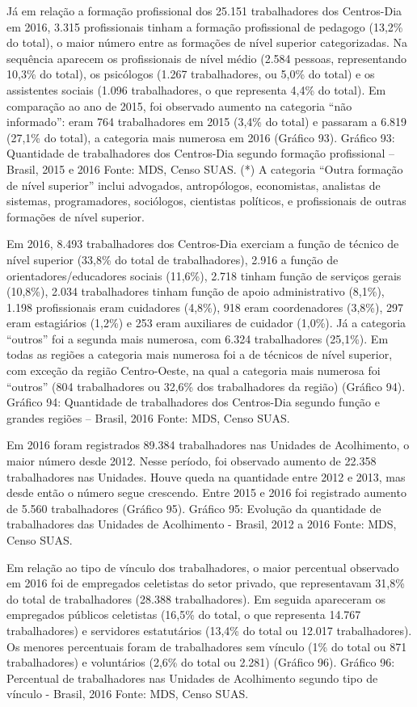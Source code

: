 \documentclass[
  brazilian]{report}
\begin{document}
Já em relação a formação profissional dos 25.151 trabalhadores dos
Centros-Dia em 2016, 3.315 profissionais tinham a formação profissional
de pedagogo (13,2\% do total), o maior número entre as formações de
nível superior categorizadas. Na sequência aparecem os profissionais de
nível médio (2.584 pessoas, representando 10,3\% do total), os
psicólogos (1.267 trabalhadores, ou 5,0\% do total) e os assistentes
sociais (1.096 trabalhadores, o que representa 4,4\% do total). Em
comparação ao ano de 2015, foi observado aumento na categoria ``não
informado'': eram 764 trabalhadores em 2015 (3,4\% do total) e passaram
a 6.819 (27,1\% do total), a categoria mais numerosa em 2016 (Gráfico
93). Gráfico 93: Quantidade de trabalhadores dos Centros-Dia segundo
formação profissional -- Brasil, 2015 e 2016 Fonte: MDS, Censo SUAS. (*)
A categoria ``Outra formação de nível superior'' inclui advogados,
antropólogos, economistas, analistas de sistemas, programadores,
sociólogos, cientistas políticos, e profissionais de outras formações de
nível superior.

Em 2016, 8.493 trabalhadores dos Centros-Dia exerciam a função de
técnico de nível superior (33,8\% do total de trabalhadores), 2.916 a
função de orientadores/educadores sociais (11,6\%), 2.718 tinham função
de serviços gerais (10,8\%), 2.034 trabalhadores tinham função de apoio
administrativo (8,1\%), 1.198 profissionais eram cuidadores (4,8\%), 918
eram coordenadores (3,8\%), 297 eram estagiários (1,2\%) e 253 eram
auxiliares de cuidador (1,0\%). Já a categoria ``outros'' foi a segunda
mais numerosa, com 6.324 trabalhadores (25,1\%). Em todas as regiões a
categoria mais numerosa foi a de técnicos de nível superior, com exceção
da região Centro-Oeste, na qual a categoria mais numerosa foi ``outros''
(804 trabalhadores ou 32,6\% dos trabalhadores da região) (Gráfico 94).
Gráfico 94: Quantidade de trabalhadores dos Centros-Dia segundo função e
grandes regiões -- Brasil, 2016 Fonte: MDS, Censo SUAS.

Em 2016 foram registrados 89.384 trabalhadores nas Unidades de
Acolhimento, o maior número desde 2012. Nesse período, foi observado
aumento de 22.358 trabalhadores nas Unidades. Houve queda na quantidade
entre 2012 e 2013, mas desde então o número segue crescendo. Entre 2015
e 2016 foi registrado aumento de 5.560 trabalhadores (Gráfico 95).
Gráfico 95: Evolução da quantidade de trabalhadores das Unidades de
Acolhimento - Brasil, 2012 a 2016 Fonte: MDS, Censo SUAS.

Em relação ao tipo de vínculo dos trabalhadores, o maior percentual
observado em 2016 foi de empregados celetistas do setor privado, que
representavam 31,8\% do total de trabalhadores (28.388 trabalhadores).
Em seguida apareceram os empregados públicos celetistas (16,5\% do
total, o que representa 14.767 trabalhadores) e servidores estatutários
(13,4\% do total ou 12.017 trabalhadores). Os menores percentuais foram
de trabalhadores sem vínculo (1\% do total ou 871 trabalhadores) e
voluntários (2,6\% do total ou 2.281) (Gráfico 96). Gráfico 96:
Percentual de trabalhadores nas Unidades de Acolhimento segundo tipo de
vínculo - Brasil, 2016 Fonte: MDS, Censo SUAS.
\end{document}

